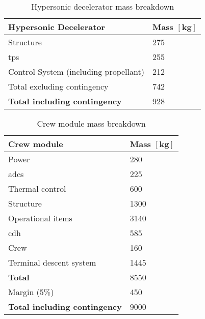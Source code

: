 \begin{table}[H]
\begin{tabular}{|p{}|p{}|}
		
	\end{tabular}
\end{table}

\newpage

\begin{table}[H]
	\centering
	\caption{Hypersonic decelerator mass breakdown}
	\label{tab:DeceleratorMass}
	\begin{tabular}{|p{}|p{}|} \hline
		\textbf {Hypersonic Decelerator}             & \textbf{Mass $\mathbf{[kg]}$ } \\ \hline \hline
		Structure          &		 275       \\ \hline
		\acrlong{tps} &		  255      \\ \hline
		Control System (including propellant) 		   &  212      \\ \hline \hline
		Total excluding contingency              	   &  742     \\ \hline
		\textbf {Total including contingency}                 &  928      \\ \hline
	\end{tabular}
\end{table}

\begin{table}[H]
	\centering
	\caption{Crew module mass breakdown}
	\label{tab:CrewModuleMass}
	\begin{tabular}{|p{}|p{}|} \hline
		\textbf {Crew module}             & \textbf{Mass $\mathbf{[kg]}$ } \\ \hline \hline
		Power        &		 280       \\ \hline
		\gls{adcs} &		  225      \\ \hline
		Thermal control & 600\\ \hline
		Structure & 1300\\ \hline
		Operational items & 3140\\ \hline
		\acrlong{cdh} & 585 \\ \hline
		Crew & 160 \\ \hline
		Terminal descent system           		   &  1445      \\ \hline \hline
		\textbf{Total}             	   &  8550     \\ \hline
		Margin (5\%) & 450							\\ \hline
		\textbf {Total including contingency}                 &  9000      \\ \hline
	\end{tabular}
\end{table}

